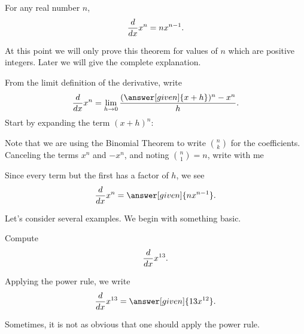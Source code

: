\documentclass{ximera}
\begin{document}
\begin{theorem}\label{T:powerrule}
For any real number $n$, 
\[
\frac{d}{dx} x^n = n x^{n-1}.
\]

\begin{explanation}
At this point we will only prove this theorem for values of $n$ which are positive
integers. Later we will give the complete explanation. 

From the limit
definition of the derivative, write
\[
\ddx x^n = \lim_{ h\to0} \frac{(\answer[given]{x+ h})^n-x^n}{h}.
\]
Start by expanding the term $(x+h)^n$:
\begin{image}
\end{image}
Note that we are using the Binomial Theorem to write $\binom{n}{k}$
for the coefficients. Canceling the terms $x^n$ and $-x^n$, and noting
$\binom{n}{1}= n$, write with me
\begin{image}
\end{image}

Since every term but the first has a factor of $h$, we see
\[
\ddx x^n = \answer[given]{nx^{n-1}}.
\]
\end{explanation}
\end{theorem}

Let's consider several examples. We begin with something basic.

\begin{example}
Compute
\[
\frac{d}{dx} x^{13}.
\]
\begin{explanation}
Applying the power rule, we write
\[
\ddx x^{13} = \answer[given]{13x^{12}}.
\]
\end{explanation}
\end{example}

Sometimes, it is not as obvious that one should apply the power rule.
\end{document}
